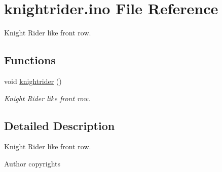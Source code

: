\hypertarget{knightrider_8ino}{}\section{knightrider.\+ino File Reference}
\label{knightrider_8ino}


Knight Rider like front row.  


\subsection*{Functions}
{\bf }\par
\begin{DoxyCompactItemize}
\item 
void \hyperlink{group__knightrider_ga58bfb7b9f8fcf7a4b02700359057a6f4}{knightrider} ()
\begin{DoxyCompactList}\small\item\em Knight Rider like front row. \end{DoxyCompactList}\end{DoxyCompactItemize}



\subsection{Detailed Description}
Knight Rider like front row. 

\begin{DoxyAuthor}{Author}
copyrights 
\end{DoxyAuthor}
